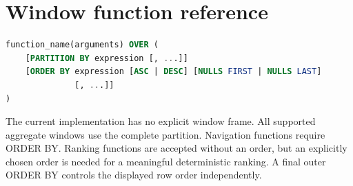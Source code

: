\section{Window function reference}
\label{sql:window-functions}

\begin{lstlisting}[language=SQL]
function_name(arguments) OVER (
    [PARTITION BY expression [, ...]]
    [ORDER BY expression [ASC | DESC] [NULLS FIRST | NULLS LAST]
              [, ...]]
)
\end{lstlisting}

The current implementation has no explicit window frame. All supported aggregate windows use the complete partition. Navigation functions require ORDER BY. Ranking functions are accepted without an order, but an explicitly chosen order is needed for a meaningful deterministic ranking. A final outer ORDER BY controls the displayed row order independently.

